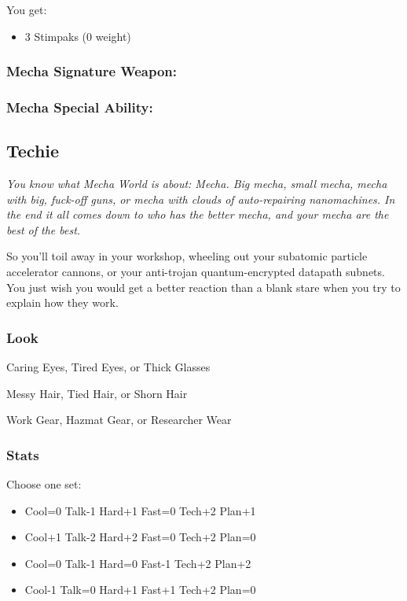 You get:
\begin{itemize}
\item 3 Stimpaks (0 weight)
\end{itemize}

\subsubsection{Mecha Signature Weapon: }

\subsubsection{Mecha Special Ability: }



\subsection{Techie}
{\itshape You know what Mecha World is about: Mecha. Big mecha, small mecha, mecha with big, fuck-off guns, or mecha with clouds of auto-repairing nanomachines. In the end it all comes down to who has the better mecha, and your mecha are the best of the best.

So you'll toil away in your workshop, wheeling out your subatomic particle accelerator cannons, or your anti-trojan quantum-encrypted datapath subnets. You just wish you would get a better reaction than a blank stare when you try to explain how they work.}

\subsubsection{Look}

Caring Eyes, Tired Eyes, or Thick Glasses

Messy Hair, Tied Hair, or Shorn Hair

Work Gear, Hazmat Gear, or Researcher Wear

\subsubsection{Stats}
Choose one set:
\begin{itemize}
\setlength\itemsep{0em}
\item Cool=0 Talk-1 Hard+1 Fast=0 Tech+2 Plan+1
\item Cool+1 Talk-2 Hard+2 Fast=0 Tech+2 Plan=0
\item Cool=0 Talk-1 Hard=0 Fast-1 Tech+2 Plan+2
\item Cool-1 Talk=0 Hard+1 Fast+1 Tech+2 Plan=0
\end{itemize}

